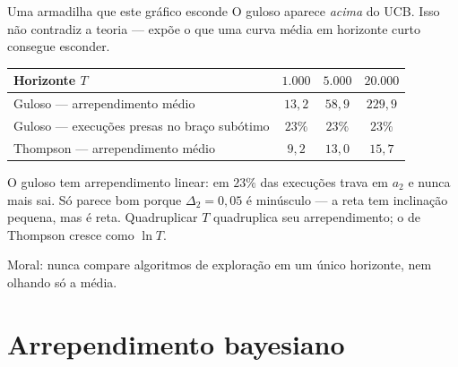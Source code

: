 \documentclass[aspectratio=169, 11pt]{beamer}
\begin{document}
\begin{frame}{Uma armadilha que este gráfico esconde}
  O guloso aparece \emph{acima} do UCB. Isso não contradiz a teoria —
  expõe o que uma curva média em horizonte curto consegue esconder.

  \smallskip
  \begin{center}\small
  \begin{tabular}{@{}lccc@{}}
    \toprule
    \textbf{Horizonte $T$} & $1{.}000$ & $5{.}000$ & $20{.}000$ \\
    \midrule
    Guloso — arrependimento médio & $13{,}2$ & $58{,}9$ & $229{,}9$ \\
    Guloso — execuções presas no braço subótimo & $23\%$ & $23\%$ & $23\%$ \\
    Thompson — arrependimento médio & $9{,}2$ & $13{,}0$ & $15{,}7$ \\
    \bottomrule
  \end{tabular}
  \end{center}

  \smallskip
  \begin{alertabox}
    O guloso tem arrependimento \alert{linear}: em $23\%$ das execuções
    trava em $a_2$ e nunca mais sai. Só parece bom porque
    $\Delta_2 = 0{,}05$ é minúsculo — a reta tem inclinação pequena, mas é
    reta. Quadruplicar $T$ quadruplica seu arrependimento; o de Thompson
    cresce como $\ln T$.
  \end{alertabox}

  \smallskip
  {\small\color{rlCinza} Moral: nunca compare algoritmos de exploração em
  um único horizonte, nem olhando só a média.}
\end{frame}

\section{Arrependimento bayesiano}
\end{document}
